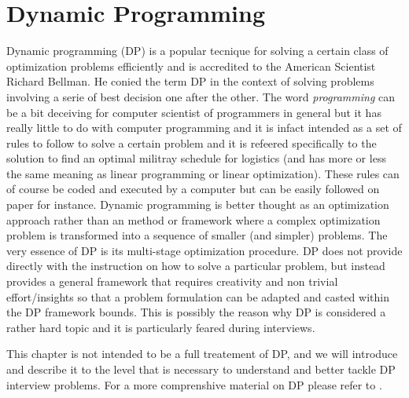 \section{Dynamic Programming}
\label{sect:appendix:DP}

Dynamic programming (DP) is a popular tecnique for solving a certain class of
optimization problems efficiently and is accredited to the American Scientist
Richard Bellman\cite{bellman1954}. He conied the term DP in the context of
solving problems involving a serie of best decision one after the other. 
The word \textit{programming} can be a bit deceiving for
computer scientist of programmers in general but it has really little to do with
computer programming and it is infact intended as a set of rules to 
follow to solve a certain problem and it is refeered specifically to the
solution to find an optimal militray schedule for logistics (and has more or
less the same meaning as linear programming or linear optimization).  These rules can of course be coded and
executed by a computer but can be easily followed on paper for instance. 
Dynamic programming is better thought as an optimization approach rather than an
method or framework where a complex optimization problem is transformed into a sequence of
smaller (and simpler) problems. The very essence of DP is its multi-stage
optimization procedure. DP does not provide directly with the
instruction on how to solve a particular problem, but instead provides a general
framework that requires creativity and non trivial effort/insights so that a
problem formulation can be adapted and casted within the DP framework bounds.
This is possibly the reason why DP is considered a rather hard topic and it is
particularly feared during interviews. 

This chapter is not intended to be a full treatement of DP, and we will
introduce and describe it to the level that is necessary to understand and
better tackle DP interview problems. For a more comprenshive material on DP
please refer to \cite{bellman1954, cormen2009}.

